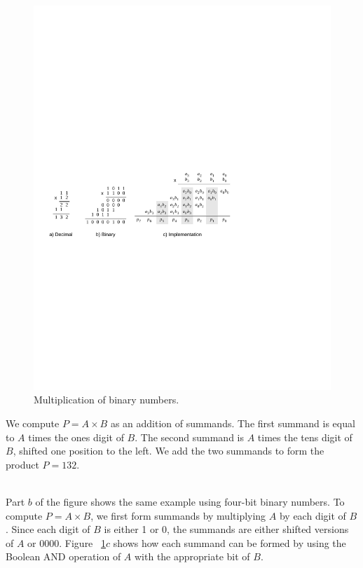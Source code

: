 \documentclass[epsfig,10pt,fullpage]{article}
\begin{document}
\begin{figure}[H]
	\begin{center}
		\includegraphics{figures/figure3.pdf}
	\end{center}
	\caption{Multiplication of binary numbers.}
	\label{fig:binary_multiplication}
\end{figure}

We compute $P = A \times B$ as an addition of summands. The first summand is equal to $A$ times the ones digit of $B$.
The second summand is $A$ times the tens digit of $B$, shifted one position to the left. We add the two summands to form the product $P = 132$.

~\\
Part $b$ of the figure shows the same example using four-bit binary numbers.
To compute $P = A \times B$, we first form summands by multiplying $A$ by each digit of $B$. Since each digit of
$B$ is either 1 or 0, the summands are either shifted versions of $A$ or 0000. Figure ~\ref{fig:binary_multiplication}$c$
shows how each summand can be formed by using the Boolean AND operation of $A$ with the appropriate bit of $B$.
\end{document}

